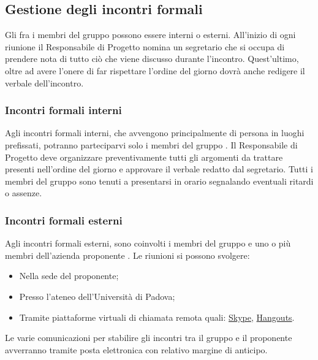 \subsection{Gestione degli incontri formali}
Gli  fra i membri del gruppo possono essere interni o esterni.
All’inizio di ogni riunione il Responsabile di Progetto nomina un segretario che si occupa di prendere nota di tutto ciò che viene discusso durante l’incontro.
Quest’ultimo, oltre ad avere l’onere di far rispettare l’ordine del giorno dovrà anche redigere il verbale dell’incontro.

\subsubsection{Incontri formali interni}
Agli incontri formali interni, che avvengono principalmente di persona in luoghi prefissati, potranno parteciparvi solo i membri del gruppo \Gruppo{}.
Il Responsabile di Progetto deve organizzare preventivamente tutti gli argomenti da trattare presenti nell’ordine del giorno e approvare il verbale redatto dal segretario.
Tutti i membri del gruppo sono tenuti a presentarsi in orario segnalando eventuali ritardi o assenze.

\subsubsection{Incontri formali esterni}
Agli incontri formali esterni, sono coinvolti i membri del gruppo \Gruppo{} e uno o più membri dell'azienda proponente \Proponente{}.
Le riunioni si possono svolgere:
\begin{itemize}
	\item Nella sede del proponente;
	\item Presso l’ateneo dell’Università di Padova;
	\item Tramite piattaforme virtuali di chiamata remota quali: \href{https://www.skype.com/it/}{Skype}, \href{https://hangouts.google.com/}{Hangouts}.
\end{itemize}

Le varie comunicazioni per stabilire gli incontri tra il gruppo e il proponente avverranno tramite posta elettronica con relativo margine di anticipo.
